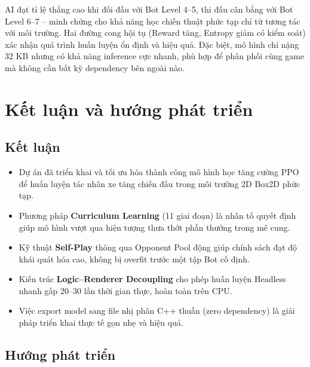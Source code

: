 \documentclass[a4paper, 12pt]{report}
\begin{document}
  AI đạt tỉ lệ thắng cao khi đối đầu với Bot Level 4--5, thi đấu cân bằng với Bot Level 6--7 -- minh chứng cho khả năng học chiến thuật phức tạp chỉ từ tương tác với môi trường. Hai đường cong hội tụ (Reward tăng, Entropy giảm có kiểm soát) xác nhận quá trình huấn luyện ổn định và hiệu quả. Đặc biệt, mô hình chỉ nặng 32 KB nhưng có khả năng inference cực nhanh, phù hợp để phân phối cùng game mà không cần bất kỳ dependency bên ngoài nào.

  \chapter{Kết luận và hướng phát triển}

  \section{Kết luận}

  \begin{itemize}
    \item Dự án đã triển khai và tối ưu hóa thành công mô hình học tăng cường PPO để huấn luyện tác nhân xe tăng chiến đấu trong môi trường 2D Box2D phức tạp.
    \item Phương pháp \textbf{Curriculum Learning} (11 giai đoạn) là nhân tố quyết định giúp mô hình vượt qua hiện tượng thưa thớt phần thưởng trong mê cung.
    \item Kỹ thuật \textbf{Self-Play} thông qua Opponent Pool động giúp chính sách đạt độ khái quát hóa cao, không bị overfit trước một tập Bot cố định.
    \item Kiến trúc \textbf{Logic--Renderer Decoupling} cho phép huấn luyện Headless nhanh gấp 20--30 lần thời gian thực, hoàn toàn trên CPU.
    \item Việc export model sang file nhị phân C++ thuần (zero dependency) là giải pháp triển khai thực tế gọn nhẹ và hiệu quả.
  \end{itemize}

  \section{Hướng phát triển}
\end{document}
